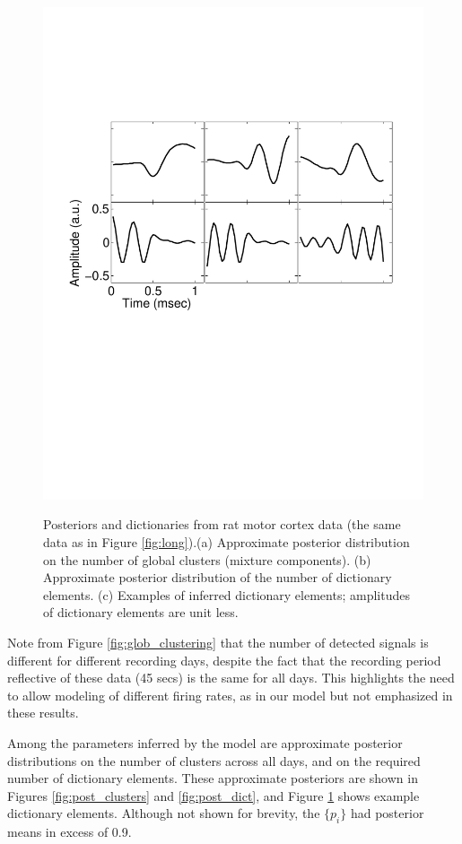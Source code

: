 \documentclass[journal]{IEEEtran}
\begin{document}
\begin{figure}[!htbp]
{   \includegraphics[width=1.0\linewidth] {figs_new/Dictionary_elements.pdf}
   \label{fig:dict_examples}
 }
  \caption{{
{Posteriors and dictionaries from rat motor cortex data (the same data as in Figure} \ref{fig:long}).(a) Approximate posterior distribution on the number of global clusters (mixture components). (b) Approximate posterior distribution of the
number of dictionary elements. (c) Examples of inferred
dictionary elements{; amplitudes of dictionary elements are unit less.} }} \vspace{-20pt}
\end{figure}


Note from Figure \ref{fig:glob_clustering} that the number of
detected signals is different for different recording days, despite
the fact that the recording period reflective of these data (45
secs) is the same for all days. This highlights the need to allow
modeling of different {firing} rates, as in our model but not
emphasized in these results.

Among the parameters inferred by the model are approximate posterior
distributions on the number of clusters across all days, and on the
required number of dictionary elements. These approximate posteriors
are shown in Figures \ref{fig:post_clusters}{ and }\ref{fig:post_dict},
and Figure \ref{fig:dict_examples} {shows } example dictionary
elements. Although not shown for brevity, the $\{p_i\}$ had posterior means in excess of 0.9.
\end{document}
